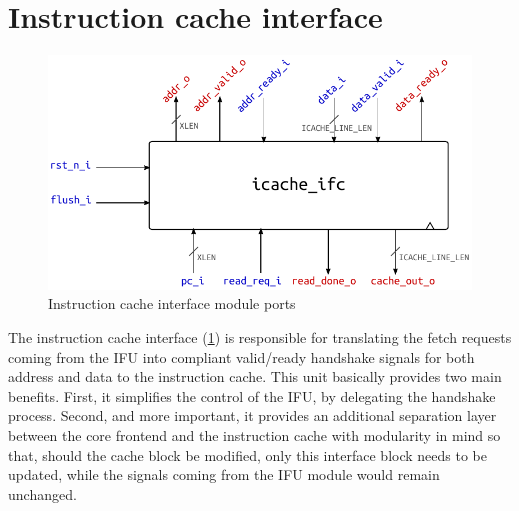 \section{Instruction cache interface}
\begin{figure}[hbt]
  \centering
  \includegraphics{img/icache_ifc-top.pdf}
  \caption{Instruction cache interface module ports}
  \label{fig:icache_ifc-top}
\end{figure}
The instruction cache interface (\cref{fig:icache_ifc-top}) is responsible for translating the fetch requests coming from the \ac{IFU} into compliant valid/ready handshake signals for both address and data to the instruction cache. This unit basically provides two main benefits. First, it simplifies the control of the \ac{IFU}, by delegating the handshake process. Second, and more important, it provides an additional separation layer between the core frontend and the instruction cache with modularity in mind so that, should the cache block be modified, only this interface block needs to be updated, while the signals coming from the \ac{IFU} module would remain unchanged.

